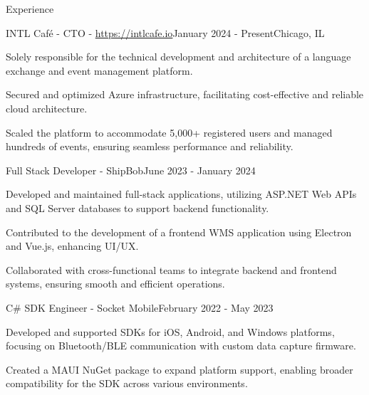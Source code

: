 \documentclass[
	10pt, %
]{resume} %
\begin{document}

\begin{rSection}{Experience}

	\begin{rSubsection}{INTL Café - CTO - \url{https://intlcafe.io}}{January 2024 - Present}{}{Chicago, IL}
		\item Solely responsible for the technical development and architecture of a language exchange and event management platform.
		\item Secured and optimized Azure infrastructure, facilitating cost-effective and reliable cloud architecture.
		\item Scaled the platform to accommodate 5,000+ registered users and managed hundreds of events, ensuring seamless performance and reliability.
	\end{rSubsection}


	\begin{rSubsection}{Full Stack Developer - ShipBob}{June 2023 - January 2024}{}{}
		\item Developed and maintained full-stack applications, utilizing ASP.NET Web APIs and SQL Server databases to support backend functionality.
		\item Contributed to the development of a frontend WMS application using Electron and Vue.js, enhancing UI/UX.
		\item Collaborated with cross-functional teams to integrate backend and frontend systems, ensuring smooth and efficient operations.	
	\end{rSubsection}


	\begin{rSubsection}{C\# SDK Engineer - Socket Mobile}{February 2022 - May 2023}{}{}
		\item Developed and supported SDKs for iOS, Android, and Windows platforms, focusing on Bluetooth/BLE communication with custom data capture firmware.
		\item Created a MAUI NuGet package to expand platform support, enabling broader compatibility for the SDK across various environments.
	\end{rSubsection}


\end{rSection}
\end{document}
